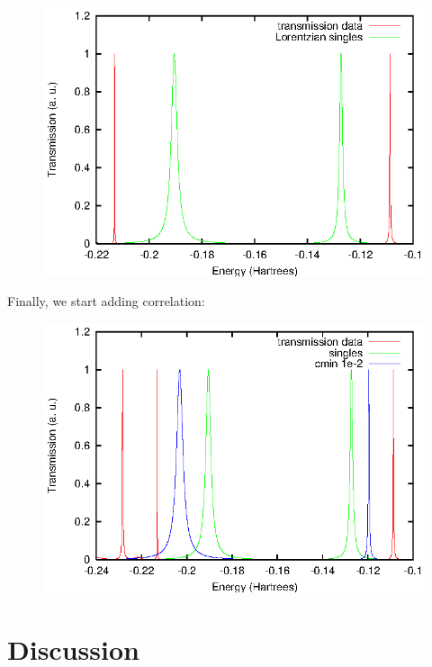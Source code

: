 \begin{figure}
	\begin{center}
		\includegraphics[width=0.9\linewidth]{figures/singles}
	\end{center}
	\caption{}
	\label{fig:singles}
\end{figure}

Finally, we start adding correlation:

\begin{figure}
	\begin{center}
		\includegraphics[width=0.9\linewidth]{figures/1em2}
	\end{center}
	\caption{}
	\label{fig:1em2}
\end{figure}

\section{Discussion}
\label{sec:discussion}

